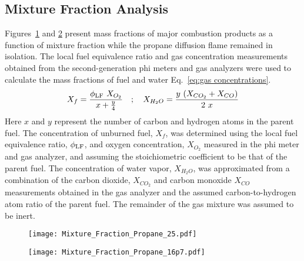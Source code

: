 \documentclass[12pt,letterpaper]{article}
\begin{document}
\begin{flushleft}
\subsection{Mixture Fraction Analysis}
\label{ssec:Mix_Frac_Anal}
Figures~\ref{fig:mix_plot_25} and \ref{fig:mix_plot_16p7} present mass fractions of major combustion products as a function of mixture fraction while the propane diffusion flame remained in isolation. The local fuel equivalence ratio and gas concentration measurements obtained from the second-generation phi meters and gas analyzers were used to calculate the mass fractions of fuel and water Eq.~\ref{eq:gas concentrations}.
\begin{equation}
\label{eq:gas concentrations}
X_f=\frac{\phi_{\rm{LF}}~X_{O_2}}{x+\frac{y}{4}} \quad ; \quad X_{H_2O}=\frac{y~(X_{CO_2}+X_{CO})}{2~x}
\end{equation}
Here $x$ and $y$ represent the number of carbon and hydrogen atoms in the parent fuel. The concentration of unburned fuel, $X_f$, was determined using the local fuel equivalence ratio, $\phi_{\rm{LF}}$, and oxygen concentration, $X_{O_2}$ measured in the phi meter and gas analyzer, and assuming the stoichiometric coefficient to be that of the parent fuel. The concentration of water vapor, $X_{H_2O}$, was approximated from a combination of the carbon dioxide, $X_{CO_2}$ and carbon monoxide $X_{CO}$ measurements obtained in the gas analyzer and the assumed carbon-to-hydrogen atom ratio of the parent fuel. The remainder of the gas mixture was assumed to be inert. 
\begin{figure}[!]
	\centering
\texttt{[image: Mixture\_Fraction\_Propane\_25.pdf]}
	\caption{}
	\label{fig:mix_plot_25}
\end{figure}

\begin{figure}[!]
	\centering
\texttt{[image: Mixture\_Fraction\_Propane\_16p7.pdf]}
	\caption{}
	\label{fig:mix_plot_16p7}
\end{figure}


\end{flushleft}
\end{document}
